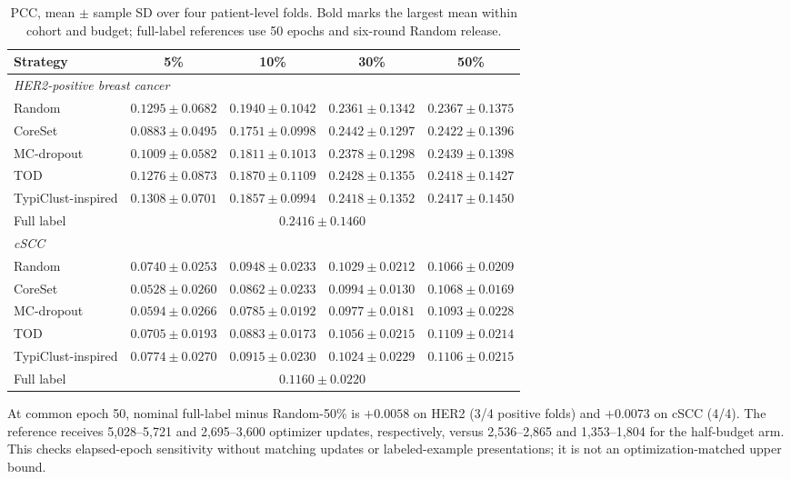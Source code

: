 \documentclass[]{spie}
\begin{document}
\begin{table}[htbp]
\centering
\caption{PCC, mean $\pm$ sample SD over four patient-level folds. Bold marks the largest mean within cohort and budget; full-label references use 50 epochs and six-round Random release.}
\label{tab:pcc}
\small
\setlength{\tabcolsep}{4pt}
\begin{tabular}{lcccc}
\hline
Strategy & 5\% & 10\% & 30\% & 50\% \\
\hline
\multicolumn{5}{l}{\emph{HER2-positive breast cancer}} \\
Random & $0.1295 \pm 0.0682$ & $\mathbf{0.1940} \pm 0.1042$ & $0.2361 \pm 0.1342$ & $0.2367 \pm 0.1375$ \\
CoreSet & $0.0883 \pm 0.0495$ & $0.1751 \pm 0.0998$ & $\mathbf{0.2442} \pm 0.1297$ & $0.2422 \pm 0.1396$ \\
MC-dropout & $0.1009 \pm 0.0582$ & $0.1811 \pm 0.1013$ & $0.2378 \pm 0.1298$ & $\mathbf{0.2439} \pm 0.1398$ \\
TOD & $0.1276 \pm 0.0873$ & $0.1870 \pm 0.1109$ & $0.2428 \pm 0.1355$ & $0.2418 \pm 0.1427$ \\
TypiClust-inspired & $\mathbf{0.1308} \pm 0.0701$ & $0.1857 \pm 0.0994$ & $0.2418 \pm 0.1352$ & $0.2417 \pm 0.1450$ \\
Full label & \multicolumn{4}{c}{$0.2416 \pm 0.1460$} \\
\hline
\multicolumn{5}{l}{\emph{cSCC}} \\
Random & $0.0740 \pm 0.0253$ & $\mathbf{0.0948} \pm 0.0233$ & $0.1029 \pm 0.0212$ & $0.1066 \pm 0.0209$ \\
CoreSet & $0.0528 \pm 0.0260$ & $0.0862 \pm 0.0233$ & $0.0994 \pm 0.0130$ & $0.1068 \pm 0.0169$ \\
MC-dropout & $0.0594 \pm 0.0266$ & $0.0785 \pm 0.0192$ & $0.0977 \pm 0.0181$ & $0.1093 \pm 0.0228$ \\
TOD & $0.0705 \pm 0.0193$ & $0.0883 \pm 0.0173$ & $\mathbf{0.1056} \pm 0.0215$ & $\mathbf{0.1109} \pm 0.0214$ \\
TypiClust-inspired & $\mathbf{0.0774} \pm 0.0270$ & $0.0915 \pm 0.0230$ & $0.1024 \pm 0.0229$ & $0.1106 \pm 0.0215$ \\
Full label & \multicolumn{4}{c}{$0.1160 \pm 0.0220$} \\
\hline
\end{tabular}
\end{table}

At common epoch 50, nominal full-label minus Random-50\% is $+0.0058$ on HER2 (3/4 positive folds) and $+0.0073$ on cSCC (4/4). The reference receives 5,028--5,721 and 2,695--3,600 optimizer updates, respectively, versus 2,536--2,865 and 1,353--1,804 for the half-budget arm. This checks elapsed-epoch sensitivity without matching updates or labeled-example presentations; it is not an optimization-matched upper bound.
\end{document}
